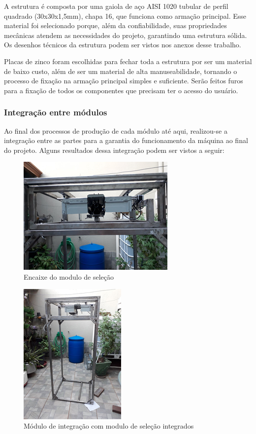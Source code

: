 A estrutura é composta por uma gaiola de aço AISI 1020 tubular de perfil quadrado (30x30x1,5mm), chapa 16, que funciona como armação  principal. Esse material foi selecionado porque, além da confiabilidade, suas propriedades mecânicas atendem as necessidades do projeto, garantindo uma estrutura sólida. Os desenhos técnicos da estrutura podem ser vistos nos anexos desse trabalho. 

Placas de zinco foram escolhidas para fechar toda a estrutura por ser um material de baixo custo, além de ser um material de alta manuseabilidade, tornando o processo de fixação na armação principal simples e suficiente. Serão feitos furos para a fixação de todos os componentes que precisam ter o acesso do usuário. 

\subsubsection{Integração entre módulos}
Ao final dos processos de produção de cada módulo até aqui, realizou-se a integração entre as partes para a garantia do funcionamento da máquina ao final do projeto. Alguns resultados dessa integração podem ser vistos a seguir:

\begin{figure}[!h]
	\centering
		\includegraphics[scale=1.1]{figuras/estrutura/31.png}
	\caption{Encaixe do modulo de seleção}
\end{figure}

\newpage

\begin{figure}[!h]
	\centering
		\includegraphics[scale=1.2]{figuras/estrutura/32.png}
	\caption{Módulo de integração com modulo de seleção integrados}
\end{figure}

